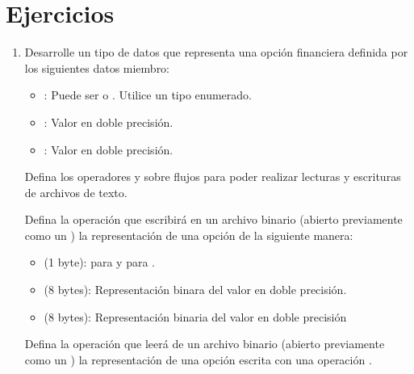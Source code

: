 \section{Ejercicios}

\begin{enumerate}

\item Desarrolle un tipo de datos  que representa una opción financiera
      definida por los siguientes datos miembro:
  \begin{itemize}
    \item {}: Puede ser  o . Utilice un tipo enumerado.
    \item {}: Valor en doble precisión.
    \item {}: Valor en doble precisión.
  \end{itemize}

  Defina los operadores \cppkey{<{}<} y \cppkey{>{}>} sobre flujos para poder
  realizar lecturas y escrituras de archivos de texto.

  Defina la operación  que escribirá en un archivo binario 
  (abierto previamente como un ) la
  representación de una opción de la siguiente manera:
    \begin{itemize}
      \item {} (1 byte):  para  y 
             para .
      \item {} (8 bytes): Representación binara del valor en doble precisión.
      \item {} (8 bytes): Representación binaria del valor en doble precisión
    \end{itemize}

  Defina la operación  que leerá de un archivo binario
  (abierto previamente como un ) la representación de una
  opción escrita con una operación .

\end{enumerate}
